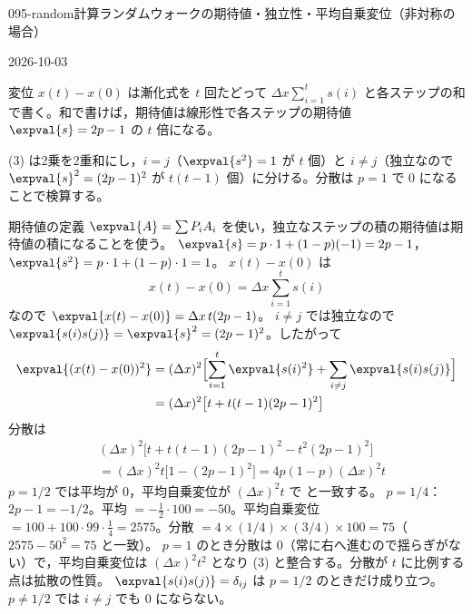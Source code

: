 \documentclass[uplatex,dvipdfmx,a4paper,11pt]{jsarticle}
\begin{document}
\begin{mondai}{095-random}{計算}{ランダムウォークの期待値・独立性・平均自乗変位（非対称の場合）}
\begin{kotaeutsushi}{2026-10-03}
\mikai
\end{kotaeutsushi}
\begin{kizuki}
\item 変位 $x(t)-x(0)$ は漸化式を $t$ 回たどって $\Delta x\sum_{i=1}^{t}s(i)$ と各ステップの和で書く。和で書けば，期待値は線形性で各ステップの期待値 $\expval{s}=2p-1$ の $t$ 倍になる。
\item (3) は2乗を2重和にし，$i=j$（$\expval{s^{2}}=1$ が $t$ 個）と $i\neq j$（独立なので $\expval{s}^{2}=(2p-1)^{2}$ が $t(t-1)$ 個）に分ける。分散は $p=1$ で 0 になることで検算する。
\end{kizuki}
\begin{tadashii}
\houshin 期待値の定義 $\expval{A}=\sum P_iA_i$ を使い，独立なステップの積の期待値は期待値の積になることを使う。
\keisan
{} $\expval{s}=p\cdot1+(1-p)(-1)=2p-1$，$\expval{s^{2}}=p\cdot1+(1-p)\cdot1=1$。
 $x(t)-x(0)$ は
\[ x(t)-x(0)=\Delta x\sum_{i=1}^{t}s(i) \]
なので $\expval{x(t)-x(0)}=\Delta x\,t(2p-1)$。
 $i\neq j$ では独立なので $\expval{s(i)s(j)}=\expval{s}^{2}=(2p-1)^{2}$。したがって
\begin{align*}
  \expval{(x(t)-x(0))^{2}}&=(\Delta x)^{2}\Bigl[\sum_{i=1}^{t}\expval{s(i)^{2}}+\sum_{i\neq j}\expval{s(i)s(j)}\Bigr]\\
  &=(\Delta x)^{2}\bigl[t+t(t-1)(2p-1)^{2}\bigr]
\end{align*}
 分散は
\begin{align*}
  &(\Delta x)^{2}\bigl[t+t(t-1)(2p-1)^{2}-t^{2}(2p-1)^{2}\bigr]\\
  &=(\Delta x)^{2}t\bigl[1-(2p-1)^{2}\bigr]=4p(1-p)(\Delta x)^{2}t
\end{align*}
$p=1/2$ では平均が 0，平均自乗変位が $(\Delta x)^{2}t$ で  と一致する。
 $p=1/4$：$2p-1=-1/2$。平均 $=-\frac{1}{2}\cdot100=-50$。平均自乗変位 $=100+100\cdot99\cdot\frac{1}{4}=2575$。分散 $=4\times(1/4)\times(3/4)\times100=75$（$2575-50^{2}=75$ と一致）。
\kenzan $p=1$ のとき分散は 0（常に右へ進むので揺らぎがない）で，平均自乗変位は $(\Delta x)^{2}t^{2}$ となり (3) と整合する。分散が $t$ に比例する点は拡散の性質。
\tsumazuki $\expval{s(i)s(j)}=\delta_{ij}$ は $p=1/2$ のときだけ成り立つ。$p\neq1/2$ では $i\neq j$ でも 0 にならない。
\end{tadashii}
\end{mondai}

\noteowari
\end{document}
